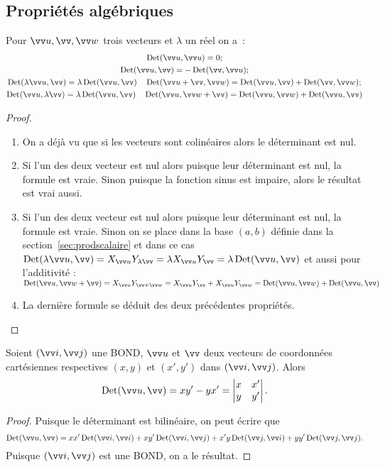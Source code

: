 \subsection{Propriétés algébriques}
\begin{prop}
Pour $\vu, \vv, \vw$ trois vecteurs et $\lambda$ un réel on a~:
\begin{gather}
  \Det(\vu,\vu)=0;\\
  \Det(\vu, \vv)=-\Det(\vv, \vu);\\
  \Det( \lambda \vu, \vv) = \lambda \Det(\vu, \vv) \quad \Det(\vu+ \vv, \vw) =\Det(\vu, \vv) + \Det(\vv, \vw);\\
  \Det(\vu, \lambda \vv) = \lambda \Det(\vu, \vv) \quad \Det(\vu, \vw + \vv) =\Det(\vu, \vw) + \Det(\vu, \vv)
\end{gather}
\end{prop}
\begin{proof}
\begin{enumerate}
\item On a déjà vu que si les vecteurs sont colinéaires alors le déterminant est nul.
\item Si l'un des deux vecteur est nul alors puisque leur déterminant est nul, la formule est vraie. Sinon puisque la fonction sinus est impaire, alors le résultat est vrai aussi.
\item Si l'un des deux vecteur est nul alors puisque leur déterminant est nul, la formule est vraie. Sinon on se place dans la base $(a,b)$ définie dans la section~\ref{sec:prodscalaire} et dans ce cas $\Det( \lambda \vu, \vv) = X_{\vu} Y_{\lambda \vv}=\lambda X_{\vu} Y_{\vv}=\lambda \Det(\vu, \vv)$ et aussi pour l'additivité : $\Det(\vu, \vw + \vv)=X_{\vu} Y_{\vv + \vw}= X_{\vu} Y_{\vv} + X_{\vu} Y_{\vw}=\Det(\vu, \vw) + \Det(\vu, \vv)$
\item La dernière formule se déduit des deux précédentes propriétés.
\end{enumerate}
\end{proof}
\begin{prop}
Soient $(\vi,\vj)$ une BOND, $\vu$ et $\vv$ deux vecteurs de coordonnées cartésiennes respectives $(x,y)$ et $(x',y')$ dans $(\vi,\vj)$. Alors 
\begin{equation}
  \Det(\vu,\vv)=xy'-yx'=\begin{vmatrix} x&x'\\y&y'\end{vmatrix}.
\end{equation}
\end{prop}
\begin{proof}
  Puisque le déterminant est bilinéaire, on peut écrire que
  \begin{equation}
    \Det(\vu,\vv)=xx' \Det(\vi,\vi) + xy' \Det(\vi,\vj)+x'y\Det(\vj,\vi)+yy'\Det(\vj,\vj).
  \end{equation}
  Puisque $(\vi,\vj)$ est une BOND, on a le résultat.
\end{proof}
